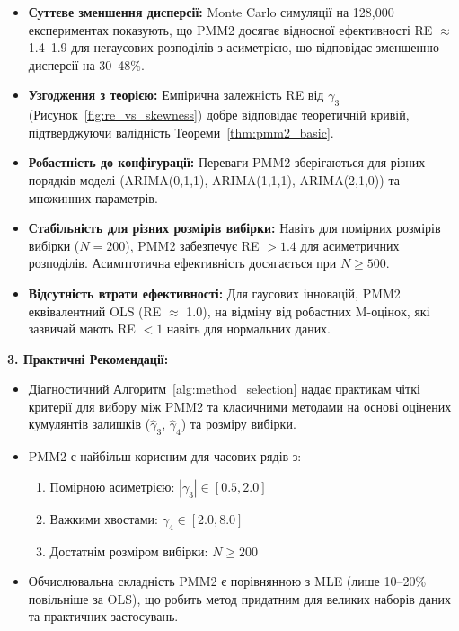 \documentclass[12pt,a4paper]{article}
\begin{document}
\begin{itemize}
    \item \textbf{Суттєве зменшення дисперсії:} Monte Carlo симуляції на 128,000 експериментах показують, що PMM2 досягає відносної ефективності RE $\approx$ 1.4--1.9 для негаусових розподілів з асиметрією, що відповідає зменшенню дисперсії на 30--48\%.

    \item \textbf{Узгодження з теорією:} Емпірична залежність RE від $\gamma_3$ (Рисунок~\ref{fig:re_vs_skewness}) добре відповідає теоретичній кривій, підтверджуючи валідність Теореми~\ref{thm:pmm2_basic}.

    \item \textbf{Робастність до конфігурації:} Переваги PMM2 зберігаються для різних порядків моделі (ARIMA(0,1,1), ARIMA(1,1,1), ARIMA(2,1,0)) та множинних параметрів.

    \item \textbf{Стабільність для різних розмірів вибірки:} Навіть для помірних розмірів вибірки ($N = 200$), PMM2 забезпечує RE $> 1.4$ для асиметричних розподілів. Асимптотична ефективність досягається при $N \geq 500$.

    \item \textbf{Відсутність втрати ефективності:} Для гаусових інновацій, PMM2 еквівалентний OLS (RE $\approx$ 1.0), на відміну від робастних M-оцінок, які зазвичай мають RE $< 1$ навіть для нормальних даних.
\end{itemize}

\textbf{3. Практичні Рекомендації:}

\begin{itemize}
    \item Діагностичний Алгоритм~\ref{alg:method_selection} надає практикам чіткі критерії для вибору між PMM2 та класичними методами на основі оцінених кумулянтів залишків ($\hat{\gamma}_3$, $\hat{\gamma}_4$) та розміру вибірки.

    \item PMM2 є найбільш корисним для часових рядів з:
    \begin{enumerate}
        \item Помірною асиметрією: $|\gamma_3| \in [0.5, 2.0]$
        \item Важкими хвостами: $\gamma_4 \in [2.0, 8.0]$
        \item Достатнім розміром вибірки: $N \geq 200$
    \end{enumerate}

    \item Обчислювальна складність PMM2 є порівнянною з MLE (лише 10--20\% повільніше за OLS), що робить метод придатним для великих наборів даних та практичних застосувань.
\end{itemize}
\end{document}
